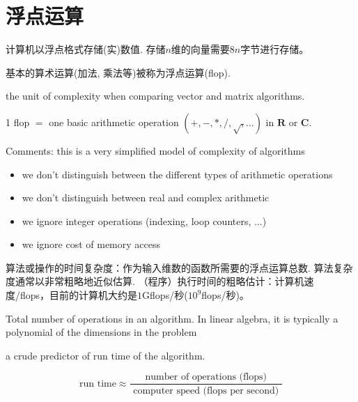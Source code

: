 \section{浮点运算}

计算机以浮点格式存储(实)数值. 存储$n$维的向量需要$8n$字节进行存储。

基本的算术运算(加法, 乘法等)被称为浮点运算(flop). 

\begin{definition}
    the unit of complexity when comparing vector and matrix algorithms.

    1 flop $ = $ one basic arithmetic operation $ (+,-, *, /, \sqrt{,} \ldots) $ in $ \mathbf{R} $ or $ \mathbf{C} $.
\end{definition}

\begin{remark}
    Comments: this is a very simplified model of complexity of algorithms

    \begin{itemize}
        \item we don't distinguish between the different types of arithmetic operations
        \item we don't distinguish between real and complex arithmetic
        \item we ignore integer operations (indexing, loop counters, ...)
        \item we ignore cost of memory access
    \end{itemize}
\end{remark}

算法或操作的时间复杂度：作为输入维数的函数所需要的浮点运算总数. 算法复杂度通常以非常粗略地近似估算. （程序）执行时间的粗略估计：计算机速度/flops，目前的计算机大约是$1$Gflops/秒($10^9$flops/秒)。

\begin{definition}
    Total number of operations in an algorithm. In linear algebra, it is typically a polynomial of the dimensions in the problem

\end{definition}
\begin{theorem}[通过浮点运算次数大致预测程序的运行时间]
    a crude predictor of run time of the algorithm.

    $$\text{run time}  \approx \frac{\text { number of operations (flops) }}{\text { computer speed (flops per second) }} $$
\end{theorem}

